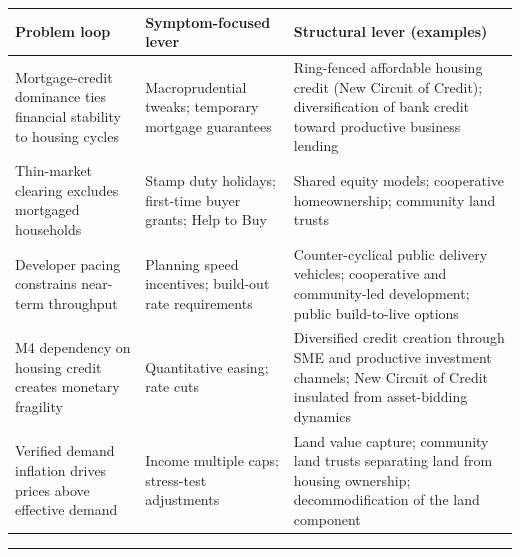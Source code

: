\documentclass[
]{article}
\newcounter{none} %
\begin{document}
{\def\LTcaptype{none} %
\begin{longtable}[]{@{}
  >{\raggedright\arraybackslash}p{}
  >{\raggedright\arraybackslash}p{}
  >{\raggedright\arraybackslash}p{}@{}}
\toprule\noalign{}
\begin{minipage}[b]{\linewidth}\raggedright
\textbf{Problem loop}
\end{minipage} & \begin{minipage}[b]{\linewidth}\raggedright
\textbf{Symptom-focused lever}
\end{minipage} & \begin{minipage}[b]{\linewidth}\raggedright
\textbf{Structural lever (examples)}
\end{minipage} \\
\midrule\noalign{}
\endhead
\bottomrule\noalign{}
\endlastfoot
Mortgage-credit dominance ties financial stability to housing cycles &
Macroprudential tweaks; temporary mortgage guarantees & Ring-fenced
affordable housing credit (New Circuit of Credit); diversification of
bank credit toward productive business lending \\
Thin-market clearing excludes mortgaged households & Stamp duty
holidays; first-time buyer grants; Help to Buy & Shared equity models;
cooperative homeownership; community land trusts \\
Developer pacing constrains near-term throughput & Planning speed
incentives; build-out rate requirements & Counter-cyclical public
delivery vehicles; cooperative and community-led development; public
build-to-live options \\
M4 dependency on housing credit creates monetary fragility &
Quantitative easing; rate cuts & Diversified credit creation through SME
and productive investment channels; New Circuit of Credit insulated from
asset-bidding dynamics \\
Verified demand inflation drives prices above effective demand & Income
multiple caps; stress-test adjustments & Land value capture; community
land trusts separating land from housing ownership; decommodification of
the land component \\
\end{longtable}
}

\begin{center}\rule{0.5\linewidth}{0.5pt}\end{center}
\end{document}

